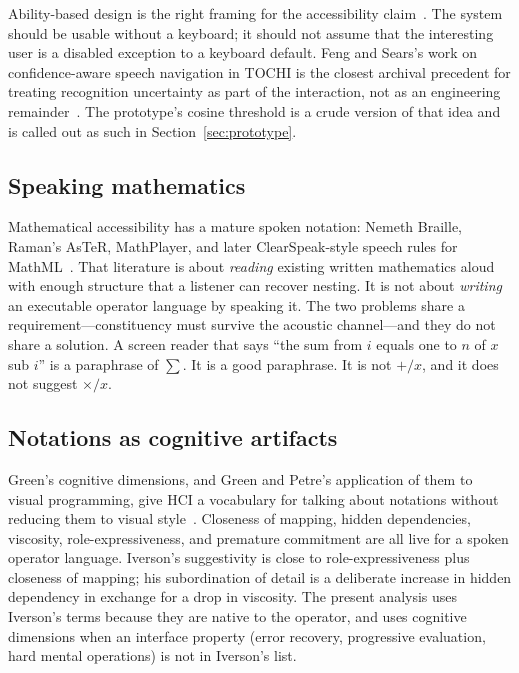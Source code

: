 \documentclass[manuscript, review, anonymous]{acmart}
\begin{document}
Ability-based design is the right framing for the accessibility claim~\cite{Wobbrock2011Ability}. The system should be usable without a keyboard; it should not assume that the interesting user is a disabled exception to a keyboard default. Feng and Sears's work on confidence-aware speech navigation in TOCHI is the closest archival precedent for treating recognition uncertainty as part of the interaction, not as an engineering remainder~\cite{Feng2004TOCHI}. The prototype's cosine threshold is a crude version of that idea and is called out as such in Section~\ref{sec:prototype}.

\subsection{Speaking mathematics}

Mathematical accessibility has a mature spoken notation: Nemeth Braille, Raman's AsTeR, MathPlayer, and later ClearSpeak-style speech rules for MathML~\cite{Nemeth1972Math,Raman1994AsTeR,Soiffer2005ASSETS,Sorge2014W4A,Baartse2018ClearSpeak}. That literature is about \emph{reading} existing written mathematics aloud with enough structure that a listener can recover nesting. It is not about \emph{writing} an executable operator language by speaking it. The two problems share a requirement---constituency must survive the acoustic channel---and they do not share a solution. A screen reader that says ``the sum from $i$ equals one to $n$ of $x$ sub $i$'' is a paraphrase of $\sum$. It is a good paraphrase. It is not $+/x$, and it does not suggest $\times/x$.

\subsection{Notations as cognitive artifacts}

Green's cognitive dimensions, and Green and Petre's application of them to visual programming, give HCI a vocabulary for talking about notations without reducing them to visual style~\cite{Green1989Design,Green1996Cognitive}. Closeness of mapping, hidden dependencies, viscosity, role-expressiveness, and premature commitment are all live for a spoken operator language. Iverson's suggestivity is close to role-expressiveness plus closeness of mapping; his subordination of detail is a deliberate increase in hidden dependency in exchange for a drop in viscosity. The present analysis uses Iverson's terms because they are native to the operator, and uses cognitive dimensions when an interface property (error recovery, progressive evaluation, hard mental operations) is not in Iverson's list.
\end{document}
